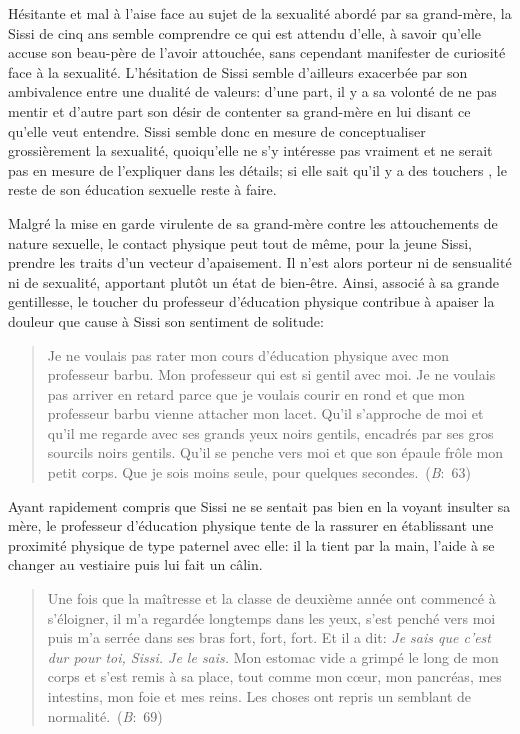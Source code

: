 Hésitante et mal à l'aise face au sujet de la sexualité abordé par sa grand-mère, la Sissi de cinq ans semble comprendre ce qui est attendu d'elle, à savoir qu'elle accuse son beau-père de l'avoir attouchée, sans cependant manifester de curiosité face à la sexualité.
L'hésitation de Sissi semble d'ailleurs exacerbée par son ambivalence entre une dualité de valeurs: d'une part, il y a sa volonté de ne pas mentir et d'autre part son désir de contenter sa grand-mère en lui disant ce qu'elle veut entendre.
Sissi semble donc en mesure de conceptualiser grossièrement la sexualité, quoiqu'elle ne s'y intéresse pas vraiment et ne serait pas en mesure de l'expliquer dans les détails; si elle sait qu'il y a des touchers , le reste de son éducation sexuelle reste à faire.
\par
Malgré la mise en garde virulente de sa grand-mère contre les attouchements de nature sexuelle, le contact physique peut tout de même, pour la jeune Sissi, prendre les traits d'un vecteur d'apaisement.
Il n'est alors porteur ni de sensualité ni de sexualité, apportant plutôt un état de bien-être.
Ainsi, associé à sa grande gentillesse, le toucher du professeur d'éducation physique contribue à apaiser la douleur que cause à Sissi son sentiment de solitude:
\begin{quote}
  \begin{singlespace}
    \small
    Je ne voulais pas rater mon cours d'éducation physique avec mon professeur barbu. Mon professeur qui est si gentil avec moi. Je ne voulais pas arriver en retard parce que je voulais courir en rond et que mon professeur barbu vienne attacher mon lacet. Qu'il s'approche de moi et qu'il me regarde avec ses grands yeux noirs gentils, encadrés par ses gros sourcils noirs gentils. Qu'il se penche vers moi et que son épaule frôle mon petit corps. Que je sois moins seule, pour quelques secondes.~(\textit{B}:~63)
    \normalsize
  \end{singlespace}
\end{quote}
Ayant rapidement compris que Sissi ne se sentait pas bien en la voyant insulter sa mère, le professeur d'éducation physique tente de la rassurer en établissant une proximité physique de type paternel avec elle: il la tient par la main, l'aide à se changer au vestiaire puis lui fait un câlin.
\begin{quote}
  \begin{singlespace}
    \small
    Une fois que la maîtresse et la classe de deuxième année ont commencé à s'éloigner, il m'a regardée longtemps dans les yeux, s'est penché vers moi puis m'a serrée dans ses bras fort, fort, fort. Et il a dit: \textit{Je sais que c'est dur pour toi, Sissi. Je le sais.} Mon estomac vide a grimpé le long de mon corps et s'est remis à sa place, tout comme mon c\oe{}ur, mon pancréas, mes intestins, mon foie et mes reins. Les choses ont repris un semblant de normalité.~(\textit{B}:~69)
    \normalsize
  \end{singlespace}
\end{quote}
